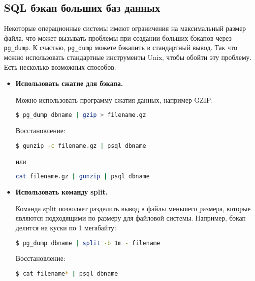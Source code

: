 \subsection{SQL бэкап больших баз данных}

Некоторые операционные системы имеют ограничения на максимальный размер файла, что может вызывать проблемы при создании больших бэкапов через \lstinline!pg_dump!. К счастью, \lstinline!pg_dump! можете бэкапить в стандартный вывод. Так что можно использовать стандартные инструменты Unix, чтобы обойти эту проблему. Есть несколько возможных способов:

\begin{itemize}
  \item \textbf{Использовать сжатие для бэкапа.}

  Можно использовать программу сжатия данных, например GZIP:

  \begin{lstlisting}[language=Bash,label=lst:backups7,caption=Сжатие бэкапа PostgreSQL]
  $ pg_dump dbname | gzip > filename.gz
  \end{lstlisting}

  Восстановление:

  \begin{lstlisting}[language=Bash,label=lst:backups8,caption=Восстановление бэкапа PostgreSQL]
  $ gunzip -c filename.gz | psql dbname
  \end{lstlisting}

  или

  \begin{lstlisting}[language=Bash,label=lst:backups9,caption=Восстановление бэкапа PostgreSQL]
  cat filename.gz | gunzip | psql dbname
  \end{lstlisting}

  \item \textbf{Использовать команду split.}

  Команда split позволяет разделить вывод в файлы меньшего размера, которые являются подходящими по размеру для файловой системы. Например, бэкап делится на куски по 1 мегабайту:

  \begin{lstlisting}[language=Bash,label=lst:backups10,caption=Создание бэкапа PostgreSQL]
  $ pg_dump dbname | split -b 1m - filename
  \end{lstlisting}

  Восстановление:

  \begin{lstlisting}[language=Bash,label=lst:backups11,caption=Восстановление бэкапа PostgreSQL]
  $ cat filename* | psql dbname
  \end{lstlisting}


\end{itemize}
